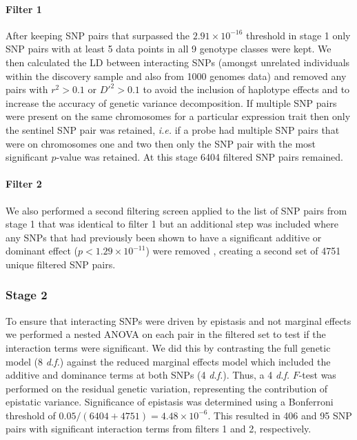 \documentclass{article}
\begin{document}
\paragraph{Filter 1} After keeping SNP pairs that surpassed the $2.91 \times 10^{-16}$ threshold in stage 1 only SNP pairs with at least 5 data points in all 9 genotype classes were kept. We then calculated the LD between interacting SNPs (amongst unrelated individuals within the discovery sample and also from 1000 genomes data) and removed any pairs with $r^2 > 0.1$ or $D'^{2} > 0.1$ to avoid the inclusion of haplotype effects and to increase the accuracy of genetic variance decomposition. If multiple SNP pairs were present on the same chromosomes for a particular expression trait then only the sentinel SNP pair was retained, \emph{i.e.} if a probe had multiple SNP pairs that were on chromosomes one and two then only the SNP pair with the most significant $p$-value was retained. At this stage 6404 filtered SNP pairs remained. 

\paragraph{Filter 2} We also performed a second filtering screen applied to the list of SNP pairs from stage 1 that was identical to filter 1 but an additional step was included where any SNPs that had previously been shown to have a significant additive or dominant effect ($p < 1.29 \times 10^{-11}$) were removed \cite{Powell2013}, creating a second set of 4751 unique filtered SNP pairs.

\subsubsection{Stage 2}

To ensure that interacting SNPs were driven by epistasis and not marginal effects we performed a nested ANOVA on each pair in the filtered set to test if the interaction terms were significant. We did this by contrasting the full genetic model (8 \emph{d.f.}) against the reduced marginal effects model which included the additive and dominance terms at both SNPs (4 \emph{d.f.}). Thus, a 4 \emph{d.f.} $F$-test was performed on the residual genetic variation, representing the contribution of epistatic variance. Significance of epistasis was determined using a Bonferroni threshold of $0.05 / (6404+4751) = 4.48 \times 10^{-6}$. This resulted in 406 and 95 SNP pairs with significant interaction terms from filters 1 and 2, respectively.
\end{document}
